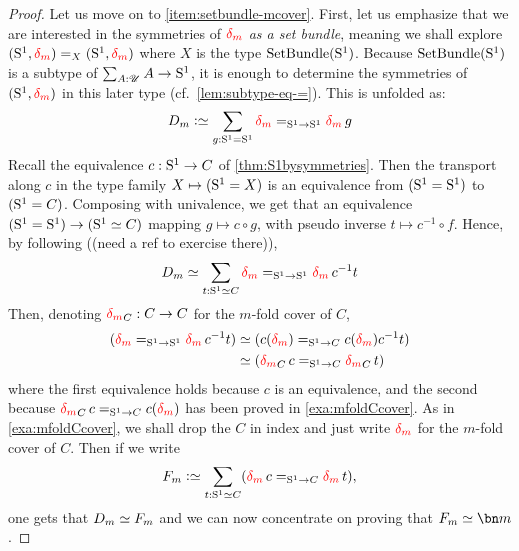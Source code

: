 \begin{proof}
  \def\blank{{-}}%
  \def\mono{\hookrightarrow}%
  \def\bigetop#1{\overline{#1}}%
  \def\bigptoe#1{\widetilde{#1}}%
  \def\inv#1{#1^{-1}}%
  \def\myq{\mathfrak m}%
  \renewcommand{\trp}[2][\null]{%
    \ifx#1\null\mathop{\mathit{trp}_{#2}}%
    \else\mathop{\mathit{trp}_{#1,#2}}%
    \fi%
  }%
  \def\bigetop#1{{#1}}%
  \def\bigptoe#1{{#1}}%
  \def\etop#1{{#1}}%
  \def\ptoe#1{{#1}}%
  Let us move on to \ref{item:setbundle-mcover}. %
  First, let us emphasize that we are interested in the symmetries of
  $\dg{m}$ {\em as a set bundle}, meaning we shall explore
  $(\Sc,\dg{m}) =_X (\Sc,\dg{m})$ where $X$ is the type
  $\mathrm{SetBundle}({\mathrm{S}^1})$.
  Because $\mathrm{SetBundle}({\mathrm{S}^1})$ is a subtype of $\sum_{A:{\mathscr{U}}}A\to {\mathrm{S}^1}$, it
  is enough to determine the symmetries of $(\Sc,\dg{m})$ in this later
  type (cf.\ \cref{lem:subtype-eq-=}). This is unfolded as:
  \begin{displaymath}
    D_m \defequi \sum_{g:\Sc = \Sc}\dg{m} =_{\Sc \to \Sc} \dg{m}\ptoe g 
  \end{displaymath}
  Recall the equivalence $c: {\mathrm{S}^1} \to C$ of
  \cref{thm:S1bysymmetries}. Then the transport along $\etop c$ in the
  type family $X\mapsto ({\mathrm{S}^1}=X)$ is an equivalence from $({\mathrm{S}^1} = {\mathrm{S}^1})$
  to $({\mathrm{S}^1} = C)$. Composing with univalence, we get that an
  equivalence $({\mathrm{S}^1}={\mathrm{S}^1}) \to ({\mathrm{S}^1} \simeq C)$ mapping
  $g\mapsto c\circ \ptoe g$, with pseudo inverse
  $t \mapsto \bigetop{\inv c \circ f}$. Hence, by following ((need a
  ref to exercise there)),
  \begin{displaymath}
    D_m \weq  \sum_{t:\Sc \weq C} \dg{m} =_{\Sc\to \Sc} \dg{m}\inv c t
  \end{displaymath}
  Then, denoting $\dg{m}_C: C \to C$ for the $m$-fold cover of $C$,
  \begin{displaymath}
    \begin{split}
      (\dg{m} =_{\Sc\to \Sc} \dg{m}\inv c t) %
      &\weq (c (\dg{m}) =_{\Sc\to C} c (\dg{m}) \inv c t)
      \\
      &\weq (\dg{m}_Cc =_{\Sc\to C} \dg{m}_C t)
    \end{split}
  \end{displaymath}
  where the first equivalence holds because $c$ is an equivalence, and
  the second because $\dg{m}_Cc =_{\Sc\to C} c (\dg{m})$ has been
  proved in \cref{exa:mfoldCcover}. As in \cref{exa:mfoldCcover}, we
  shall drop the $C$ in index and just write $\dg{m}$ for the
  $m$-fold cover of $C$. Then if we write
  \begin{displaymath}
    F_m \defequi \sum_{t:\Sc \weq C}(\dg{m}c =_{\Sc\to C} \dg{m} t),
  \end{displaymath}
  one gets that $D_m \simeq F_m$ and we can now concentrate on proving that
  $F_m \weq \bn m$.


\end{proof}
